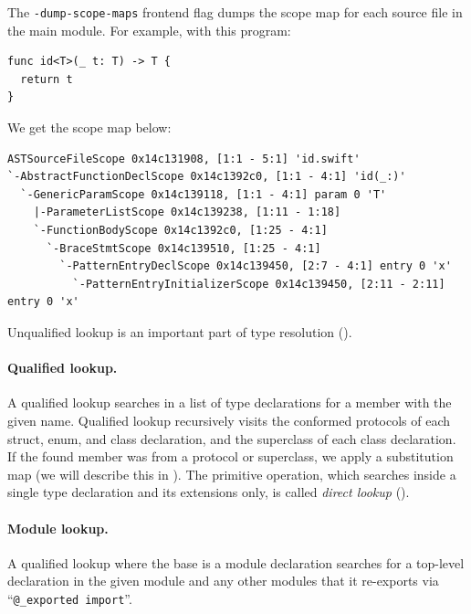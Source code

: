 \documentclass[../generics]{subfiles}
\begin{document}
The \texttt{-dump-scope-maps} frontend flag dumps the scope map for each source file in the main module. For example, with this program:
\begin{Verbatim}
func id<T>(_ t: T) -> T {
  return t
}
\end{Verbatim}
We get the scope map below:
\begin{Verbatim}[fontsize=\scriptsize,numbers=none]
ASTSourceFileScope 0x14c131908, [1:1 - 5:1] 'id.swift'
`-AbstractFunctionDeclScope 0x14c1392c0, [1:1 - 4:1] 'id(_:)'
  `-GenericParamScope 0x14c139118, [1:1 - 4:1] param 0 'T'
    |-ParameterListScope 0x14c139238, [1:11 - 1:18]
    `-FunctionBodyScope 0x14c1392c0, [1:25 - 4:1]
      `-BraceStmtScope 0x14c139510, [1:25 - 4:1]
        `-PatternEntryDeclScope 0x14c139450, [2:7 - 4:1] entry 0 'x'
          `-PatternEntryInitializerScope 0x14c139450, [2:11 - 2:11] entry 0 'x'
\end{Verbatim}

Unqualified lookup is an important part of type resolution ().

\paragraph{Qualified lookup.}
A qualified lookup searches in a list of type declarations for a member with the given name. Qualified lookup recursively visits the conformed protocols of each struct, enum, and class declaration, and the superclass of each class declaration. If the found member was from a protocol or superclass, we apply a substitution map (we will describe this in ). The primitive operation, which searches inside a single type declaration and its extensions only, is called \emph{direct lookup}  ().

\paragraph{Module lookup.} A qualified lookup where the base is a module declaration searches for a top-level declaration in the given module and any other modules that it re-exports via ``\verb|@_exported import|''.
\end{document}
